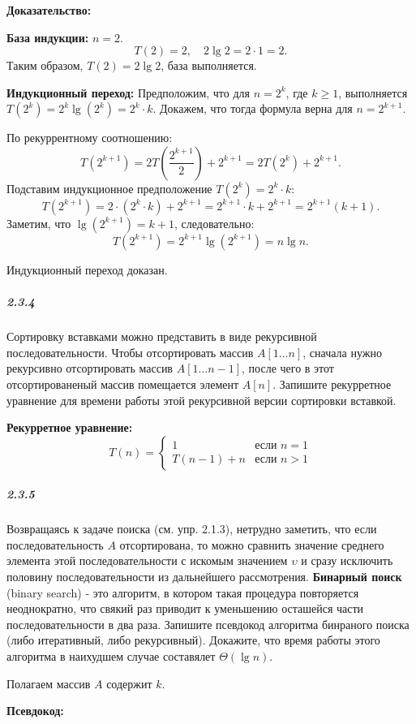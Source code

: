 \textbf{Доказательство:}

\textbf{База индукции:} $n = 2$.
\[
T(2) = 2, \quad 2 \lg 2 = 2 \cdot 1 = 2.
\]
Таким образом, $T(2) = 2 \lg 2$, база выполняется.

\textbf{Индукционный переход:}
Предположим, что для $n = 2^k$, где $k \ge 1$, выполняется $T(2^k) = 2^k \lg(2^k) = 2^k \cdot k$.
Докажем, что тогда формула верна для $n = 2^{k+1}$.

По рекуррентному соотношению:
\[
T(2^{k+1}) = 2T\left(\frac{2^{k+1}}{2}\right) + 2^{k+1} = 2T(2^k) + 2^{k+1}.
\]
Подставим индукционное предположение $T(2^k) = 2^k \cdot k$:
\[
T(2^{k+1}) = 2 \cdot (2^k \cdot k) + 2^{k+1} = 2^{k+1} \cdot k + 2^{k+1} = 2^{k+1}(k + 1).
\]
Заметим, что $\lg(2^{k+1}) = k + 1$, следовательно:
\[
T(2^{k+1}) = 2^{k+1} \lg(2^{k+1}) = n \lg n.
\]

Индукционный переход доказан.

\subparagraph{2.3.4}
Сортировку вставками можно представить в виде рекурсивной последовательности. 
Чтобы отсортировать массив $A[1 \ldots n]$, сначала нужно рекурсивно отсортировать массив $A[1 \ldots n-1]$, 
после чего в этот отсортированеный массив помещается элемент $A[n]$. 
Запишите рекурретное уравнение для времени работы этой рекурсивной версии сортировки вставкой.

\textbf{Рекурретное уравнение:}
\[
T(n) = \begin{cases}
1 & \text{если } n = 1 \\
T(n - 1) + n & \text{если } n > 1
\end{cases}
\] 

\subparagraph{2.3.5}
Возвращаясь к задаче поиска (см. упр. 2.1.3), нетрудно заметить, что если последовательность $A$ отсортирована,
то можно сравнить  значение среднего элемента этой последовательности с искомым значением $\upsilon$ и
сразу исключить половину последовательности из дальнейшего рассмотрения. \textbf{Бинарный поиск} (binary search) - это алгоритм,
в котором такая процедура повторяется неоднократно, что свякий раз приводит к уменьшению осташейся части последовательности в два раза.
Запишите псевдокод алгоритма бинраного поиска (либо итеративный, либо рекурсивный).
Докажите, что время работы этого алгоритма в наихудшем случае составялет $\Theta(\lg{n})$.

Полагаем массив $A \text{ содержит } k$.

\textbf{Псевдокод:}

